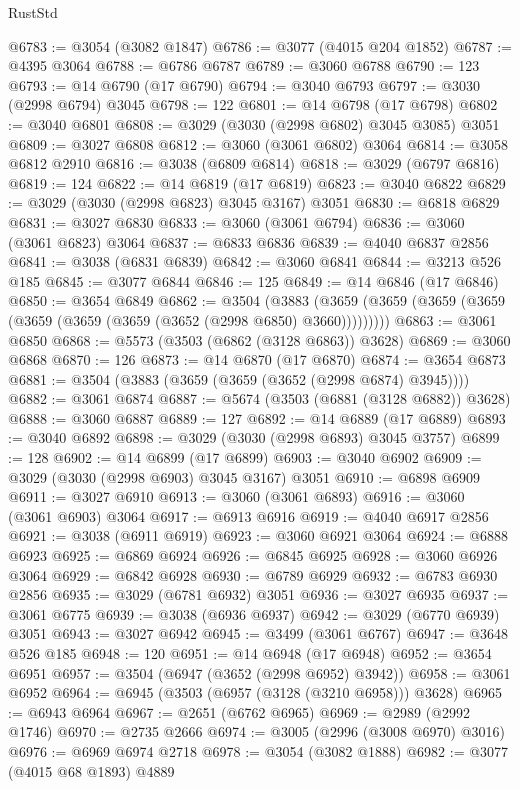 \begin{lexlean}{RustStd}
\begin{coremodule}
@6783 := @3054 (@3082 @1847)
@6786 := @3077 (@4015 @204 @1852)
@6787 := @4395 @3064
@6788 := @6786 @6787
@6789 := @3060 @6788
@6790 := 123
@6793 := @14 @6790 (@17 @6790)
@6794 := @3040 @6793
@6797 := @3030 (@2998 @6794) @3045
@6798 := 122
@6801 := @14 @6798 (@17 @6798)
@6802 := @3040 @6801
@6808 := @3029 (@3030 (@2998 @6802) @3045 @3085) @3051
@6809 := @3027 @6808
@6812 := @3060 (@3061 @6802) @3064
@6814 := @3058 @6812 @2910
@6816 := @3038 (@6809 @6814)
@6818 := @3029 (@6797 @6816)
@6819 := 124
@6822 := @14 @6819 (@17 @6819)
@6823 := @3040 @6822
@6829 := @3029 (@3030 (@2998 @6823) @3045 @3167) @3051
@6830 := @6818 @6829
@6831 := @3027 @6830
@6833 := @3060 (@3061 @6794)
@6836 := @3060 (@3061 @6823) @3064
@6837 := @6833 @6836
@6839 := @4040 @6837 @2856
@6841 := @3038 (@6831 @6839)
@6842 := @3060 @6841
@6844 := @3213 @526 @185
@6845 := @3077 @6844
@6846 := 125
@6849 := @14 @6846 (@17 @6846)
@6850 := @3654 @6849
@6862 := @3504
    (@3883 (@3659 (@3659 (@3659 (@3659 (@3659 (@3659 (@3659 (@3652 (@2998 @6850) @3660)))))))))
@6863 := @3061 @6850
@6868 := @5573 (@3503 (@6862 (@3128 @6863)) @3628)
@6869 := @3060 @6868
@6870 := 126
@6873 := @14 @6870 (@17 @6870)
@6874 := @3654 @6873
@6881 := @3504 (@3883 (@3659 (@3659 (@3652 (@2998 @6874) @3945))))
@6882 := @3061 @6874
@6887 := @5674 (@3503 (@6881 (@3128 @6882)) @3628)
@6888 := @3060 @6887
@6889 := 127
@6892 := @14 @6889 (@17 @6889)
@6893 := @3040 @6892
@6898 := @3029 (@3030 (@2998 @6893) @3045 @3757)
@6899 := 128
@6902 := @14 @6899 (@17 @6899)
@6903 := @3040 @6902
@6909 := @3029 (@3030 (@2998 @6903) @3045 @3167) @3051
@6910 := @6898 @6909
@6911 := @3027 @6910
@6913 := @3060 (@3061 @6893)
@6916 := @3060 (@3061 @6903) @3064
@6917 := @6913 @6916
@6919 := @4040 @6917 @2856
@6921 := @3038 (@6911 @6919)
@6923 := @3060 @6921 @3064
@6924 := @6888 @6923
@6925 := @6869 @6924
@6926 := @6845 @6925
@6928 := @3060 @6926 @3064
@6929 := @6842 @6928
@6930 := @6789 @6929
@6932 := @6783 @6930 @2856
@6935 := @3029 (@6781 @6932) @3051
@6936 := @3027 @6935
@6937 := @3061 @6775
@6939 := @3038 (@6936 @6937)
@6942 := @3029 (@6770 @6939) @3051
@6943 := @3027 @6942
@6945 := @3499 (@3061 @6767)
@6947 := @3648 @526 @185
@6948 := 120
@6951 := @14 @6948 (@17 @6948)
@6952 := @3654 @6951
@6957 := @3504 (@6947 (@3652 (@2998 @6952) @3942))
@6958 := @3061 @6952
@6964 := @6945 (@3503 (@6957 (@3128 (@3210 @6958))) @3628)
@6965 := @6943 @6964
@6967 := @2651 (@6762 @6965)
@6969 := @2989 (@2992 @1746)
@6970 := @2735 @2666
@6974 := @3005 (@2996 (@3008 @6970) @3016)
@6976 := @6969 @6974 @2718
@6978 := @3054 (@3082 @1888)
@6982 := @3077 (@4015 @68 @1893) @4889

\end{coremodule}
\end{lexlean}
